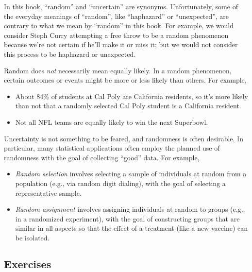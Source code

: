 \documentclass[
  letterpaper,
  DIV=11,
  numbers=noendperiod]{scrreprt}
\providecommand{\tightlist}{%
  \setlength{\itemsep}{0pt}\setlength{\parskip}{0pt}}
\theoremstyle{plain}
\theoremstyle{definition}
\theoremstyle{definition}
\theoremstyle{definition}
\theoremstyle{remark}
\begin{document}
In this book, ``random'' and ``uncertain'' are synonyms. Unfortunately,
some of the everyday meanings of ``random'', like ``haphazard'' or
``unexpected'', are contrary to what we mean by ``random'' in this book.
For example, we would consider Steph Curry attempting a free throw to be
a random phenomenon because we're not certain if he'll make it or miss
it; but we would not consider this process to be haphazard or
unexpected.

Random does \emph{not} necessarily mean equally likely. In a random
phenomenon, certain outcomes or events might be more or less likely than
others. For example,

\begin{itemize}
\tightlist
\item
  About 84\% of students at Cal Poly are California residents, so it's
  more likely than not that a randomly selected Cal Poly student is a
  California resident.
\item
  Not all NFL teams are equally likely to win the next Superbowl.
\end{itemize}

Uncertainty is not something to be feared, and randomness is often
desirable. In particular, many statistical applications often employ the
planned use of randomness with the goal of collecting ``good'' data. For
example,

\begin{itemize}
\tightlist
\item
  \emph{Random selection} involves selecting a sample of individuals at
  random from a population (e.g., via random digit dialing), with the
  goal of selecting a representative sample.\\
\item
  \emph{Random assignment} involves assigning individuals at random to
  groups (e.g., in a randomized experiment), with the goal of
  constructing groups that are similar in all aspects so that the effect
  of a treatment (like a new vaccine) can be isolated.
\end{itemize}

\subsection{Exercises}\label{exercises}
\end{document}
